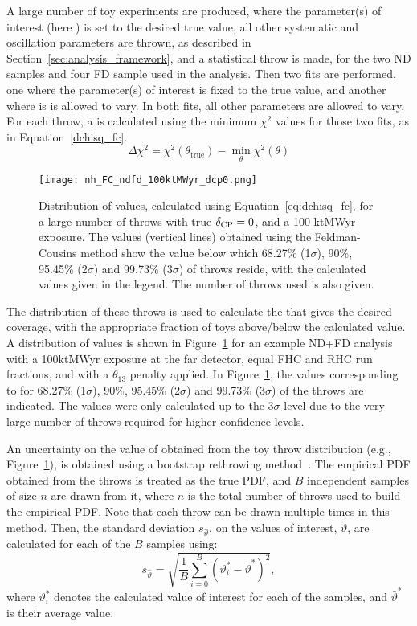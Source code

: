 A large number of toy experiments are produced, where the parameter(s) of interest (here \deltacp) is set to the desired true value, all other systematic and oscillation parameters are thrown, as described in Section~\ref{sec:analysis_framework}, and a statistical throw is made, for the two ND samples and four FD sample used in the analysis. Then two fits are performed, one where the parameter(s) of interest is fixed to the true value, and another where is is allowed to vary. In both fits, all other parameters are allowed to vary. For each throw, a \dchisq is calculated using the minimum $\chi^{2}$ values for those two fits, as in Equation~\ref{dchisq_fc}.
\begin{equation}
  \Delta\chi^{2} = \chi^{2}(\theta_{\mathrm{true}}) - \min_{\theta}\chi^{2}(\theta)
  \label{eq:dchisq_fc}
\end{equation}
\begin{figure}[htbp]
  \centering
  \texttt{[image: nh\_FC\_ndfd\_100ktMWyr\_dcp0.png]}
  \caption{Distribution of \dchisq values, calculated using Equation~\ref{eq:dchisq_fc}, for a large number of throws with true $\delta_{\rm CP} = 0$, and a 100 ktMWyr exposure. The \dchisqcrit values (vertical lines) obtained using the Feldman-Cousins method show the \dchisq value below which 68.27\% (1$\sigma$), 90\%, 95.45\% (2$\sigma$) and 99.73\% (3$\sigma$) of throws reside, with the calculated values given in the legend. The number of throws used is also given.}
  \label{fig:fc_throws}
\end{figure}
The distribution of these throws is used to calculate the \dchisqcrit that gives the desired coverage, with the appropriate fraction of toys above/below the calculated value. A distribution of \dchisq values is shown in Figure~\ref{fig:fc_throws} for an example ND+FD analysis with a 100ktMWyr exposure at the far detector, equal FHC and RHC run fractions, and with a $\theta_{13}$ penalty applied. In Figure~\ref{fig:fc_throws}, the \dchisqcrit values corresponding to for 68.27\% (1$\sigma$), 90\%, 95.45\% (2$\sigma$) and 99.73\% (3$\sigma$) of the throws are indicated. The \dchisqcrit values were only calculated up to the 3$\sigma$ level due to the very large number of throws required for higher confidence levels.

An uncertainty on the value of \dchisqcrit obtained from the toy throw distribution (e.g., Figure~\ref{fig:fc_throws}), is obtained using a bootstrap rethrowing method~\cite{rice2006mathematical}. The empirical PDF obtained from the throws is treated as the true PDF, and $B$ independent samples of size $n$ are drawn from it, where $n$ is the total number of throws used to build the empirical PDF. Note that each throw can be drawn multiple times in this method. Then, the standard deviation $s_{\hat{\vartheta}}$, on the \dchisqcrit values of interest, $\vartheta$, are calculated for each of the $B$ samples using:
\begin{equation}
  s_{\hat{\vartheta}} = \sqrt{\frac{1}{B} \sum^{B}_{i=0} (\vartheta_{i}^{*} - \bar{\vartheta}^{*})^{2}},
  \label{eq:fc_uncertainty}
\end{equation}
where $\vartheta_{i}^{*}$ denotes the calculated \dchisqcrit value of interest for each of the samples, and $\bar{\vartheta}^{*}$ is their average value.

